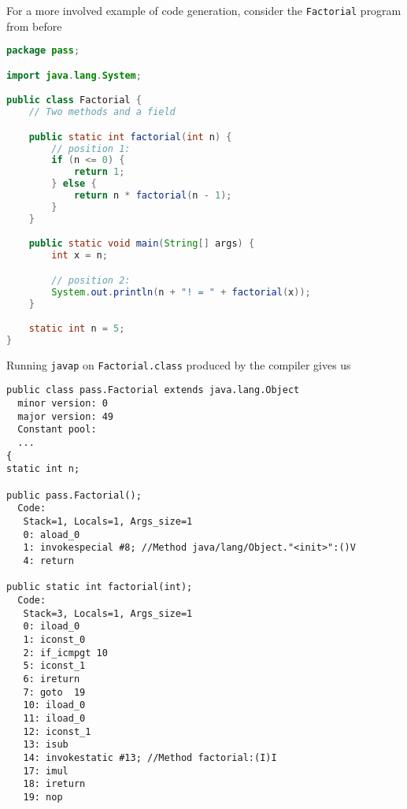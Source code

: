 \documentclass[8pt,a4paper,compress]{beamer}
\begin{document}
\begin{frame}[fragile]
\pause

For a more involved example of code generation, consider the \lstinline{Factorial} program from before
\begin{lstlisting}[language=Java]
package pass;

import java.lang.System;

public class Factorial {
    // Two methods and a field

    public static int factorial(int n) {
        // position 1:
        if (n <= 0) {
            return 1;
        } else {
            return n * factorial(n - 1);
        }
    }

    public static void main(String[] args) {
        int x = n;

        // position 2:
        System.out.println(n + "! = " + factorial(x));
    }

    static int n = 5;
}
\end{lstlisting}
\end{frame}

\begin{frame}[fragile]
\pause

Running \lstinline{javap} on \lstinline{Factorial.class} produced by the \jmm compiler gives us

\begin{lstlisting}[language={}]
public class pass.Factorial extends java.lang.Object
  minor version: 0
  major version: 49
  Constant pool:
  ...
{
static int n;

public pass.Factorial();
  Code:
   Stack=1, Locals=1, Args_size=1
   0: aload_0
   1: invokespecial #8; //Method java/lang/Object."<init>":()V
   4: return

public static int factorial(int);
  Code:
   Stack=3, Locals=1, Args_size=1
   0: iload_0
   1: iconst_0
   2: if_icmpgt 10
   5: iconst_1
   6: ireturn
   7: goto  19
   10: iload_0
   11: iload_0
   12: iconst_1
   13: isub
   14: invokestatic #13; //Method factorial:(I)I
   17: imul
   18: ireturn
   19: nop
\end{lstlisting}
\end{frame}
\end{document}
